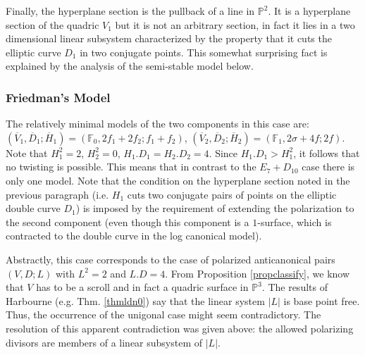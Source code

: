 \documentclass{amsart}
\numberwithin{equation}{section}
\theoremstyle{plain}
\theoremstyle{remark}
\theoremstyle{definition}
\newcommand{\bP}{\mathbb{P}}
\newcommand{\bF}{\mathbb{F}}
\newcommand{\oD}{\overline{D}}
\newcommand{\oV}{\overline{V}}
\newcommand{\oH}{\overline{H}}
\begin{document}
Finally, the hyperplane section is the pullback of a line in $\bP^2$. It is a hyperplane section of the quadric $V_1$ but it is not an arbitrary section, in fact it lies in a two dimensional  linear subsystem characterized by the property that it cuts the elliptic curve $D_1$ in two conjugate points. This somewhat surprising fact is explained by the analysis of the semi-stable model below. 

\subsubsection{Friedman's Model} The relatively minimal models of the two components in this case are: $(\oV_1,\oD_1;\oH_1)=(\bF_0, 2f_1+2f_2;f_1+f_2)$, $(\oV_2,\oD_2;\oH_2)=(\bF_1,2\sigma+4f;2f)$. Note that $H_1^2=2$, $H_2^2=0$, $H_1.D_1=H_2.D_2=4$. Since $H_1.D_1>H_1^2$, it follows that no twisting is possible. This means that in contrast to the $E_7+D_{10}$ case there is only one model. Note that the condition on the hyperplane section noted in the previous paragraph (i.e. $H_1$ cuts two conjugate pairs of points on the elliptic double curve $D_1$) is imposed by the requirement of extending the polarization to the second component (even though this component is a $1$-surface, which is contracted to the double curve in the log canonical model). 


Abstractly, this case corresponds to the case of polarized anticanonical pairs $(V,D;L)$ with $L^2=2$ and $L.D=4$. From Proposition \ref{propclassify}, we know that $V$ has to be a scroll and in fact a quadric surface in $\bP^3$. The results of Harbourne (e.g. Thm. \ref{thmldn0}) say that the linear system $|L|$ is base point free. Thus, the occurrence of the unigonal case might seem contradictory. The resolution of this apparent contradiction was given above: the allowed polarizing divisors are members of a linear subsystem of $|L|$.  

\end{document}
